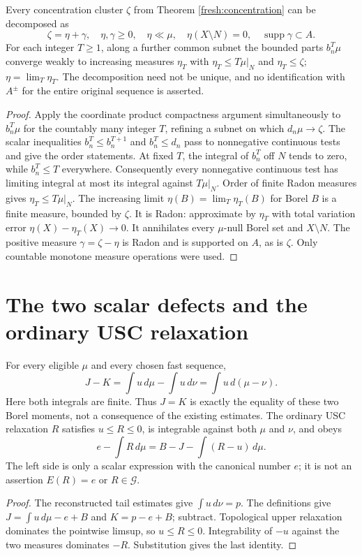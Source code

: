 \begin{proposition}\label{fresh:cluster-split}
Every concentration cluster $\zeta$ from
Theorem \ref{fresh:concentration} can be decomposed as
\[
 \zeta=\eta+\gamma,\quad \eta,\gamma\ge0,
 \quad \eta\ll\mu,\quad\eta(X\setminus N)=0,
 \quad\operatorname{supp}\gamma\subset A.
\]
For each integer $T\ge1$, along a further common subnet the bounded
parts $b_n^T\mu$ converge weakly to increasing measures $\eta_T$ with
$\eta_T\le T\mu|_N$ and $\eta_T\le\zeta$; $\eta=\lim_T\eta_T$.
The decomposition need not be unique, and no identification with
$A^\pm$ for the entire original sequence is asserted.
\end{proposition}
\begin{proof}
Apply the coordinate product compactness argument simultaneously to
$b_n^T\mu$ for the countably many integer $T$, refining a subnet on
which $d_n\mu\to\zeta$. The scalar inequalities $b_n^T\le b_n^{T+1}$
and $b_n^T\le d_n$ pass to nonnegative continuous tests and give the
order statements. At fixed $T$, the integral of $b_n^T$ off $N$ tends
to zero, while $b_n^T\le T$ everywhere. Consequently every
nonnegative continuous test has limiting integral at most its integral
against $T\mu|_N$. Order of finite Radon measures gives
$\eta_T\le T\mu|_N$.
The increasing limit $\eta(B)=\lim_T\eta_T(B)$ for Borel $B$ is a
finite measure, bounded by $\zeta$. It is Radon: approximate by
$\eta_T$ with total variation error
$\eta(X)-\eta_T(X)\to0$. It annihilates every $\mu$-null Borel set
and $X\setminus N$. The positive measure $\gamma=\zeta-\eta$ is
Radon and is supported on $A$, as is $\zeta$. Only countable
monotone measure operations were used.
\end{proof}

\section{The two scalar defects and the ordinary USC relaxation}
\begin{proposition}\label{fresh:JK}
For every eligible $\mu$ and every chosen fast sequence,
\[
 J-K=\int u\,d\mu-\int u\,d\nu=\int u\,d(\mu-\nu).
\]
Here both integrals are finite. Thus $J=K$ is exactly the equality of
these two Borel moments, not a consequence of the existing estimates.
The ordinary USC relaxation $R$ satisfies $u\le R\le0$, is
integrable against both $\mu$ and $\nu$, and obeys
\[
 e-\int R\,d\mu=B-J-\int(R-u)\,d\mu.
\]
The left side is only a scalar expression with the canonical number
$e$; it is not an assertion $E(R)=e$ or $R\in\mathcal G$.
\end{proposition}
\begin{proof}
The reconstructed tail estimates give $\int u\,d\nu=p$. The
definitions give $J=\int u\,d\mu-e+B$ and $K=p-e+B$; subtract.
Topological upper relaxation dominates the pointwise limsup, so
$u\le R\le0$. Integrability of $-u$ against the two measures
dominates $-R$. Substitution gives the last identity.
\end{proof}

